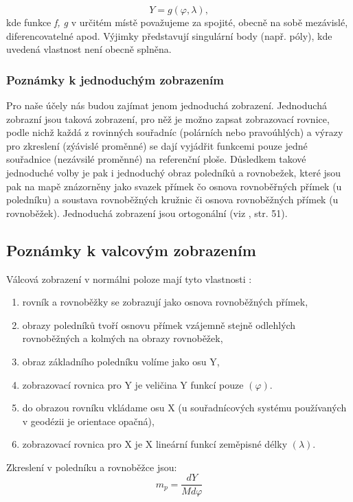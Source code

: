 \begin{equation}
Y = g\left(\varphi, \lambda\right),
\end{equation}
kde funkce \textit{f, g} v určitém místě považujeme za spojité, obecně na sobě mezávislé, diferencovatelné apod. Výjimky představují singulární body (např. póly), kde uvedená vlastnost není obecně splněna.

\subsubsection{Poznámky k jednoduchým zobrazením}
Pro naše účely nás budou zajímat jenom jednoduchá zobrazení. Jednoduchá zobrazní jsou taková zobrazení, pro něž je možno zapsat zobrazovací rovnice, podle nichž každá  z rovinných souřadníc (polárních nebo pravoúhlých) a výrazy pro zkreslení (zýávislé proměnné) se dají vyjádřit funkcemi pouze jedné souřadnice (nezávsilé proměnné) na referenční ploše. Důsledkem takové jednoduché volby je pak i jednoduchý obraz poledníků a rovnobežek, které jsou pak na mapě znázorněny jako svazek přímek čo osnova rovnoběřných přímek (u poledníku) a soustava rovnoběžných kružnic či osnova rovnoběžných přímek (u rovnoběžek). Jednoduchá zobrazení jsou ortogonální (viz \cite{Buchar2002}, str. 51).

\subsection{Poznámky k valcovým zobrazením}
Válcová zobrazení v normálni poloze mají tyto vlastnosti \cite{Buchar2002}:
\begin{enumerate}
\item rovník a rovnoběžky se zobrazují jako osnova rovnoběžných přímek,
\item obrazy poledníků tvoří osnovu přímek vzájemně stejně odlehlých rovnoběžných a kolmých na obrazy rovnoběžek,
\item obraz základního poledníku volíme jako osu Y, 
\item zobrazovací rovnica pro Y je veličina Y funkcí pouze $\left(\varphi\right)$.
\item do obrazou rovníku vkládame osu X (u souřadnícových systému používaných v geodézii je orientace opačná),
\item zobrazovací rovnica pro X je X lineární funkcí zeměpisné délky $\left(\lambda\right)$.
\end{enumerate}

Zkreslení v poledníku a rovnoběžce jsou:
\begin{equation}
m_{p} = \dfrac{dY}{M d\varphi}
\label{rov:zkresValPol}
\end{equation}

